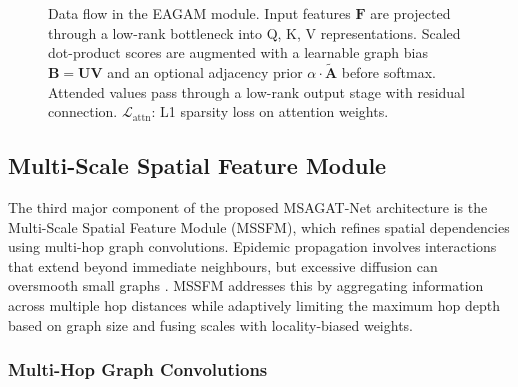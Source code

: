 \documentclass[a4paper,fleqn]{cas-dc}
\begin{document}
\begin{figure}
{}%
\caption{Data flow in the EAGAM module. Input features $\mathbf{F}$ are projected through a low-rank bottleneck into Q, K, V representations. Scaled dot-product scores are augmented with a learnable graph bias $\mathbf{B}=\mathbf{UV}$ and an optional adjacency prior $\alpha\cdot\tilde{\mathbf{A}}$ before softmax. Attended values pass through a low-rank output stage with residual connection. $\mathcal{L}_{\mathrm{attn}}$: L1 sparsity loss on attention weights.}
\label{fig:eagam_module}
\end{figure}

\subsection{Multi-Scale Spatial Feature Module}
\label{sec:mssfm}

The third major component of the proposed MSAGAT-Net architecture is the Multi-Scale Spatial Feature Module (MSSFM), which refines spatial dependencies using multi-hop graph convolutions. Epidemic propagation involves interactions that extend beyond immediate neighbours, but excessive diffusion can oversmooth small graphs \cite{li2018deeper}. MSSFM addresses this by aggregating information across multiple hop distances while adaptively limiting the maximum hop depth based on graph size and fusing scales with locality-biased weights.

\subsubsection{Multi-Hop Graph Convolutions}
\end{document}
